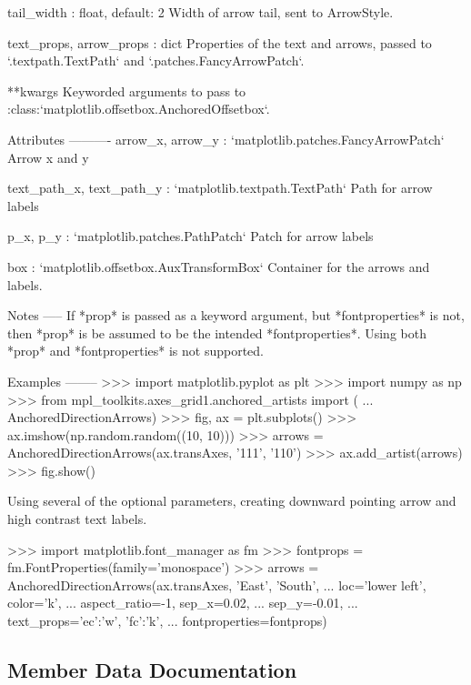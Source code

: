 \begin{DoxyVerb}
tail_width : float, default: 2
    Width of arrow tail, sent to ArrowStyle.

text_props, arrow_props : dict
    Properties of the text and arrows, passed to
    `.textpath.TextPath` and `.patches.FancyArrowPatch`.

**kwargs
    Keyworded arguments to pass to
    :class:`matplotlib.offsetbox.AnchoredOffsetbox`.

Attributes
----------
arrow_x, arrow_y : `matplotlib.patches.FancyArrowPatch`
    Arrow x and y

text_path_x, text_path_y : `matplotlib.textpath.TextPath`
    Path for arrow labels

p_x, p_y : `matplotlib.patches.PathPatch`
    Patch for arrow labels

box : `matplotlib.offsetbox.AuxTransformBox`
    Container for the arrows and labels.

Notes
-----
If *prop* is passed as a keyword argument, but *fontproperties* is
not, then *prop* is be assumed to be the intended *fontproperties*.
Using both *prop* and *fontproperties* is not supported.

Examples
--------
>>> import matplotlib.pyplot as plt
>>> import numpy as np
>>> from mpl_toolkits.axes_grid1.anchored_artists import (
...     AnchoredDirectionArrows)
>>> fig, ax = plt.subplots()
>>> ax.imshow(np.random.random((10, 10)))
>>> arrows = AnchoredDirectionArrows(ax.transAxes, '111', '110')
>>> ax.add_artist(arrows)
>>> fig.show()

Using several of the optional parameters, creating downward pointing
arrow and high contrast text labels.

>>> import matplotlib.font_manager as fm
>>> fontprops = fm.FontProperties(family='monospace')
>>> arrows = AnchoredDirectionArrows(ax.transAxes, 'East', 'South',
...                                  loc='lower left', color='k',
...                                  aspect_ratio=-1, sep_x=0.02,
...                                  sep_y=-0.01,
...                                  text_props={'ec':'w', 'fc':'k'},
...                                  fontproperties=fontprops)
\end{DoxyVerb}
 

\subsection{Member Data Documentation}
\mbox{\label{classaxes__grid1_1_1anchored__artists_1_1AnchoredDirectionArrows_ae4853f197917523030af5a9c18128e55}} 
